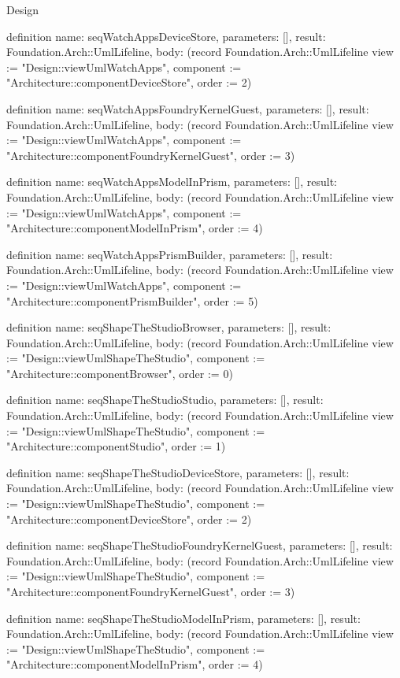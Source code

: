 \begin{lexlean}{Design}
\begin{semanticmodule}
definition{
  name: seqWatchAppsDeviceStore,
  parameters: [],
  result: Foundation.Arch::UmlLifeline,
  body: (record Foundation.Arch::UmlLifeline {view := "Design::viewUmlWatchApps", component := "Architecture::componentDeviceStore", order := 2})
}

definition{
  name: seqWatchAppsFoundryKernelGuest,
  parameters: [],
  result: Foundation.Arch::UmlLifeline,
  body: (record Foundation.Arch::UmlLifeline {view := "Design::viewUmlWatchApps", component := "Architecture::componentFoundryKernelGuest", order := 3})
}

definition{
  name: seqWatchAppsModelInPrism,
  parameters: [],
  result: Foundation.Arch::UmlLifeline,
  body: (record Foundation.Arch::UmlLifeline {view := "Design::viewUmlWatchApps", component := "Architecture::componentModelInPrism", order := 4})
}

definition{
  name: seqWatchAppsPrismBuilder,
  parameters: [],
  result: Foundation.Arch::UmlLifeline,
  body: (record Foundation.Arch::UmlLifeline {view := "Design::viewUmlWatchApps", component := "Architecture::componentPrismBuilder", order := 5})
}

definition{
  name: seqShapeTheStudioBrowser,
  parameters: [],
  result: Foundation.Arch::UmlLifeline,
  body: (record Foundation.Arch::UmlLifeline {view := "Design::viewUmlShapeTheStudio", component := "Architecture::componentBrowser", order := 0})
}

definition{
  name: seqShapeTheStudioStudio,
  parameters: [],
  result: Foundation.Arch::UmlLifeline,
  body: (record Foundation.Arch::UmlLifeline {view := "Design::viewUmlShapeTheStudio", component := "Architecture::componentStudio", order := 1})
}

definition{
  name: seqShapeTheStudioDeviceStore,
  parameters: [],
  result: Foundation.Arch::UmlLifeline,
  body: (record Foundation.Arch::UmlLifeline {view := "Design::viewUmlShapeTheStudio", component := "Architecture::componentDeviceStore", order := 2})
}

definition{
  name: seqShapeTheStudioFoundryKernelGuest,
  parameters: [],
  result: Foundation.Arch::UmlLifeline,
  body: (record Foundation.Arch::UmlLifeline {view := "Design::viewUmlShapeTheStudio", component := "Architecture::componentFoundryKernelGuest", order := 3})
}

definition{
  name: seqShapeTheStudioModelInPrism,
  parameters: [],
  result: Foundation.Arch::UmlLifeline,
  body: (record Foundation.Arch::UmlLifeline {view := "Design::viewUmlShapeTheStudio", component := "Architecture::componentModelInPrism", order := 4})
}


\end{semanticmodule}
\end{lexlean}
